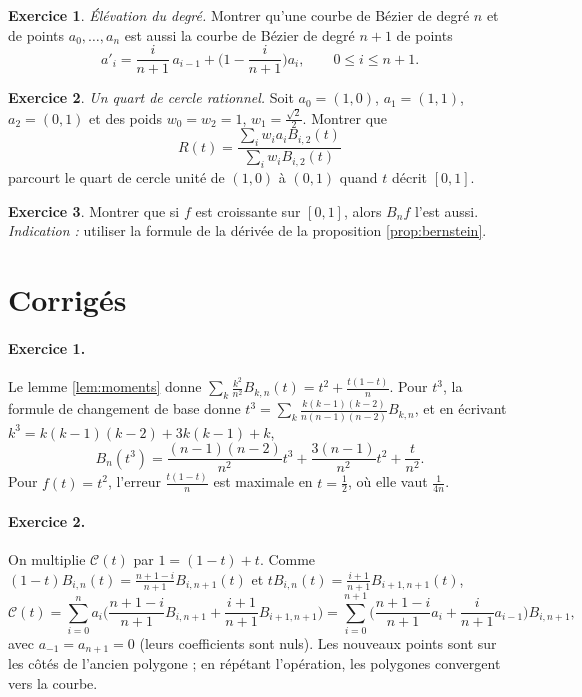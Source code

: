 \documentclass[11pt,a4paper]{article}
\theoremstyle{plain}
\theoremstyle{definition}
\newtheorem{exercice}{Exercice}
\theoremstyle{remark}
\newcommand{\C}{\mathcal{C}}
\begin{document}
\begin{exercice}\label{exo:elevation}
\emph{Élévation du degré.} Montrer qu'une courbe de Bézier de degré $n$ et de points $a_0,\dots,a_n$ est aussi la courbe de Bézier de degré $n+1$ de points
\[
  a'_i=\frac i{n+1}\,a_{i-1}+\Big(1-\frac i{n+1}\Big)a_i,\qquad0\leq i\leq n+1 .
\]
\end{exercice}

\begin{exercice}\label{exo:cercle}
\emph{Un quart de cercle rationnel.} Soit $a_0=(1,0)$, $a_1=(1,1)$, $a_2=(0,1)$ et des poids $w_0=w_2=1$, $w_1=\frac{\sqrt2}2$. Montrer que
\[
  R(t)=\frac{\sum_iw_ia_iB_{i,2}(t)}{\sum_iw_iB_{i,2}(t)}
\]
parcourt le quart de cercle unité de $(1,0)$ à $(0,1)$ quand $t$ décrit $[0,1]$.
\end{exercice}

\begin{exercice}\label{exo:monotonie}
Montrer que si $f$ est croissante sur $[0,1]$, alors $B_nf$ l'est aussi. \emph{Indication :} utiliser la formule de la dérivée de la proposition \ref{prop:bernstein}.
\end{exercice}

\section{Corrigés}

\paragraph{Exercice 1.} Le lemme \ref{lem:moments} donne $\sum_k\frac{k^2}{n^2}B_{k,n}(t)=t^2+\frac{t(1-t)}n$. Pour $t^3$, la formule de changement de base donne $t^3=\sum_k\frac{k(k-1)(k-2)}{n(n-1)(n-2)}B_{k,n}$, et en écrivant $k^3=k(k-1)(k-2)+3k(k-1)+k$,
\[
  B_n(t^3)=\frac{(n-1)(n-2)}{n^2}t^3+\frac{3(n-1)}{n^2}t^2+\frac t{n^2} .
\]
Pour $f(t)=t^2$, l'erreur $\frac{t(1-t)}n$ est maximale en $t=\frac12$, où elle vaut $\frac1{4n}$.

\paragraph{Exercice 2.} On multiplie $\C(t)$ par $1=(1-t)+t$. Comme $(1-t)B_{i,n}(t)=\frac{n+1-i}{n+1}B_{i,n+1}(t)$ et $tB_{i,n}(t)=\frac{i+1}{n+1}B_{i+1,n+1}(t)$,
\[
  \C(t)=\sum_{i=0}^na_i\Big(\frac{n+1-i}{n+1}B_{i,n+1}+\frac{i+1}{n+1}B_{i+1,n+1}\Big)=\sum_{i=0}^{n+1}\Big(\frac{n+1-i}{n+1}a_i+\frac i{n+1}a_{i-1}\Big)B_{i,n+1},
\]
avec $a_{-1}=a_{n+1}=0$ (leurs coefficients sont nuls). Les nouveaux points sont sur les côtés de l'ancien polygone ; en répétant l'opération, les polygones convergent vers la courbe.
\end{document}
